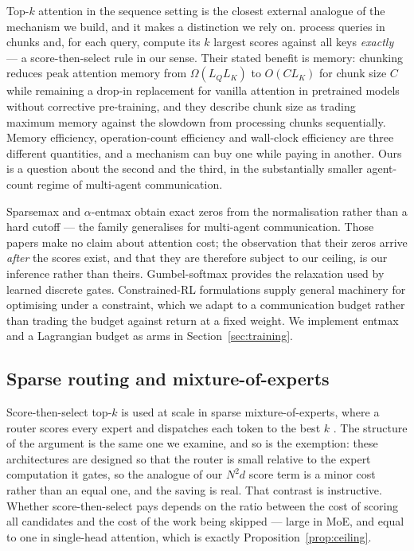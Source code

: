 Top-$k$ attention in the sequence setting is the closest external analogue of
the mechanism we build, and it makes a distinction we rely on.
\citet{gupta2021topk} process queries in chunks and, for each query, compute
its $k$ largest scores against all keys \emph{exactly} --- a score-then-select
rule in our sense. Their stated benefit is memory: chunking reduces peak
attention memory from $\Omega(L_Q L_K)$ to $O(C L_K)$ for chunk size $C$ while
remaining a drop-in replacement for vanilla attention in pretrained models
without corrective pre-training, and they describe chunk size as trading
maximum memory against the slowdown from processing chunks sequentially. Memory
efficiency, operation-count efficiency and wall-clock efficiency are three
different quantities, and a mechanism can buy one while paying in another. Ours
is a question about the second and the third, in the substantially smaller
agent-count regime of multi-agent communication.

Sparsemax \citep{martins2016sparsemax} and $\alpha$-entmax
\citep{peters2019entmax} obtain exact zeros from the normalisation rather than
a hard cutoff --- the family \citet{sun2020sparsecomm} generalises for
multi-agent communication. Those papers make no claim about attention cost; the
observation that their zeros arrive \emph{after} the scores exist, and that
they are therefore subject to our ceiling, is our inference rather than theirs.
Gumbel-softmax \citep{jang2017gumbel} provides the
relaxation used by learned discrete gates. Constrained-RL formulations
\citep{achiam2017cpo,stooke2020pidlagrangian} supply general machinery for
optimising under a constraint, which we adapt to a communication budget rather
than trading the budget against return at a
fixed weight. We implement entmax and a Lagrangian budget as arms in
Section~\ref{sec:training}.

\subsection{Sparse routing and mixture-of-experts}

Score-then-select top-$k$ is used at scale in sparse mixture-of-experts,
where a router scores every expert and dispatches each token to the best $k$
\citep{shazeer2017moe,fedus2022switch}. The structure of the argument is the
same one we examine, and so is the exemption: these architectures are designed
so that the router is small relative to the expert computation it gates, so the
analogue of our $N^2 d$ score term is a minor cost rather than an equal one,
and the saving is real. That contrast is instructive. Whether
score-then-select pays depends on the ratio between the cost of scoring all
candidates and the cost of the work being skipped --- large in MoE, and equal
to one in single-head attention, which is exactly Proposition~\ref{prop:ceiling}.

